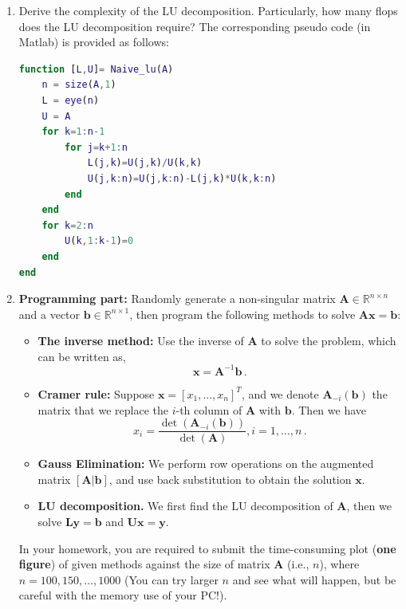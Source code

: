 \documentclass[english,onecolumn]{IEEEtran}
\begin{document}
\begin{enumerate}
	\item Derive the complexity of the LU decomposition. Particularly, how many flops does the LU decomposition require? The corresponding pseudo code (in {\sf Matlab}) is provided as follows: 
\begin{lstlisting}[language=Matlab]
function [L,U]= Naive_lu(A) 
    n = size(A,1)
    L = eye(n)
    U = A 
    for k=1:n-1
        for j=k+1:n
            L(j,k)=U(j,k)/U(k,k)
            U(j,k:n)=U(j,k:n)-L(j,k)*U(k,k:n)
        end
    end
    for k=2:n
        U(k,1:k-1)=0
    end
end
\end{lstlisting}
\item 
\textbf{Programming part:} 
Randomly generate a non-singular matrix $\mathbf{A}\in\mathbb{R}^{n\times n}$ and a vector $\mathbf{b}\in\mathbb{R}^{n\times 1}$, then program the following  methods to solve $\mathbf{Ax=b}$: 
\begin{itemize}
  \item {\bf The inverse method:} Use the inverse of $\mathbf{A}$ to solve the problem, which can be written as,
  \[
  \mathbf{x}=\mathbf{A}^{-1}\mathbf{b}\,.
  \]
  \item {\bf Cramer rule:} Suppose $\mathbf{x}=[x_1,\dots,x_n]^T$, and we denote $\mathbf{A}_{-i}(\mathbf{b})$ the matrix that we replace the $i$-th column of $\mathbf{A}$ with $\mathbf{b}$. Then we have
    \[
      x_i=\frac{\det(\mathbf{A}_{-i}(\mathbf{b}))}{\det(\mathbf{A})}, i=1,\dots,n\,.
    \]
  \item {\bf Gauss Elimination:} We perform row operations on the augmented matrix $[\mathbf{A}|\mathbf{b}]$, and use back substitution to obtain the solution $\mathbf{x}$.
  \item {\bf LU decomposition.} We first find the LU decomposition of $\mathbf{A}$, then we solve $\mathbf{L}\mathbf{y}=\mathbf{b}$ and $\mathbf{U}\mathbf{x}=\mathbf{y}$.
\end{itemize}
In your homework, you are required to submit the time-consuming plot (\textbf{one figure}) of given methods against the size of matrix $\mathbf{A}$ (i.e., $n$), where $n=100, 150,\dots, 1000$ (You can try larger $n$ and see what will happen, but be careful with the memory use of your PC!). 

\newpage


\end{enumerate}
\end{document}
